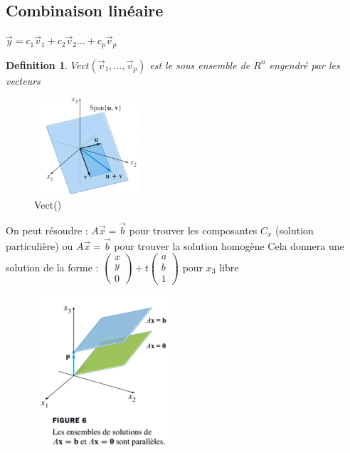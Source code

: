\documentclass{article}
\newtheorem{definition}{Definition}[section]
\begin{document}
\subsection{Combinaison linéaire}
\( \overrightarrow{y} = c_1\overrightarrow{v}_1 + c_2\overrightarrow{v}_2 ... + c_p\overrightarrow{v}_p \) 
\begin{definition}
    \(Vect(\overrightarrow{v}_1, ..., \overrightarrow{v}_p)\) est le sous ensemble de \(R^n\) engendré par les vecteurs
\end{definition}
\begin{figure}[htp]
    \centering
    \includegraphics[width=4cm]{Images/Span.png}
    \caption{Vect()}
    \label{fig:span}
\end{figure}
On peut résoudre : \( A\overrightarrow{x} = \overrightarrow{b}\) pour trouver les composantes \(C_x\) (solution particulière) ou \( A\overrightarrow{x} = \overrightarrow{b}\) pour trouver la solution homogène \newpage
Cela donnera une solution de la forme : \(\begin{pmatrix}
    x \\
    y \\
    0
\end{pmatrix} + t\begin{pmatrix}
    a \\
    b \\
    1
\end{pmatrix} \)  pour \(x_3\) libre \\
\begin{figure}[htp]
    \centering
    \includegraphics[width=5cm]{Images/Paralleles.png}
    \label{fig:parallele}
\end{figure}
\end{document}
